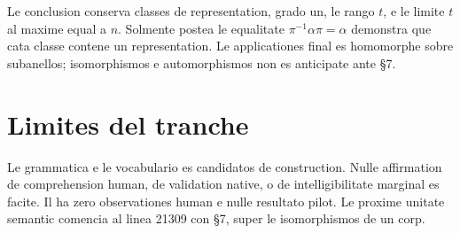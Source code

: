 \documentclass[11pt]{article}
\begin{document}
Le conclusion conserva classes de representation, grado un, le rango \(t\), e le limite \(t\) al maxime equal a \(n\). Solmente postea le equalitate \(\pi^{-1}\alpha\pi=\alpha\) demonstra que cata classe contene un representation. Le applicationes final es homomorphe sobre subanellos; isomorphismos e automorphismos non es anticipate ante §7.

\section*{Limites del tranche}

Le grammatica e le vocabulario es candidatos de construction. Nulle affirmation de comprehension human, de validation native, o de intelligibilitate marginal es facite. Il ha zero observationes human e nulle resultato pilot. Le proxime unitate semantic comencia al linea 21309 con §7, super le isomorphismos de un corp.
\end{document}
